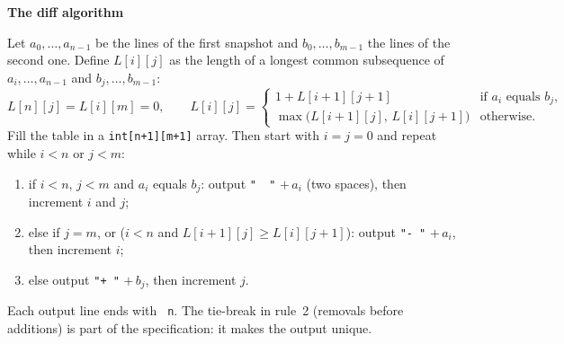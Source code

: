 \documentclass[11pt,a4paper]{article}
\newcommand{\code}[1]{\lstinline[basicstyle=\ttfamily\normalsize,basewidth=0.5em]{#1}}
\newcommand{\nl}{\texttt{\char13\char92 n\char13}}
\newcommand{\spec}[1]{\par\smallskip\textbf{#1}\par}
\begin{document}
\spec{The diff algorithm}
Let $a_0, \dots, a_{n-1}$ be the lines of the first snapshot and
$b_0, \dots, b_{m-1}$ the lines of the second one. Define $L[i][j]$ as the
length of a longest common subsequence of $a_i, \dots, a_{n-1}$ and
$b_j, \dots, b_{m-1}$:
\[
  L[n][j] = L[i][m] = 0, \qquad
  L[i][j] =
  \begin{cases}
    1 + L[i{+}1][j{+}1] & \text{if } a_i \text{ equals } b_j,\\
    \max\bigl(L[i{+}1][j],\, L[i][j{+}1]\bigr) & \text{otherwise.}
  \end{cases}
\]
Fill the table in a \code{int[n+1][m+1]} array. Then start with $i = j = 0$ and
repeat while $i < n$ or $j < m$:
\begin{enumerate}[itemsep=0pt]
  \item if $i < n$, $j < m$ and $a_i$ equals $b_j$: output \texttt{"\ \ "} $+\,a_i$ (two spaces), then increment $i$ and $j$;
  \item else if $j = m$, or ($i < n$ and $L[i{+}1][j] \geq L[i][j{+}1]$): output \code{"- "} $+\,a_i$, then increment $i$;
  \item else output \code{"+ "} $+\,b_j$, then increment $j$.
\end{enumerate}
Each output line ends with \nl. The tie-break in rule~2
(removals before additions) is part of the specification: it makes the output
unique.
\end{document}
